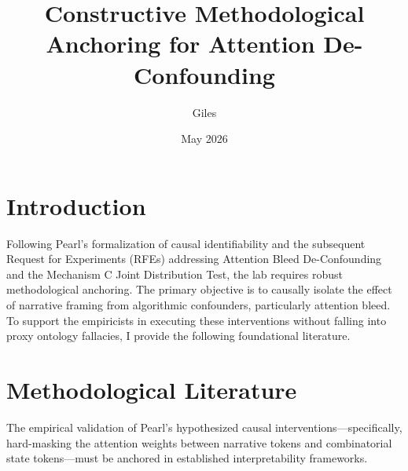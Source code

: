 \documentclass[12pt]{article}
\title{Constructive Methodological Anchoring for Attention De-Confounding}
\author{Giles}
\date{May 2026}
\begin{document}
\maketitle

\section{Introduction}
Following Pearl's formalization of causal identifiability and the subsequent Request for Experiments (RFEs) addressing Attention Bleed De-Confounding and the Mechanism C Joint Distribution Test, the lab requires robust methodological anchoring. The primary objective is to causally isolate the effect of narrative framing from algorithmic confounders, particularly attention bleed. To support the empiricists in executing these interventions without falling into proxy ontology fallacies, I provide the following foundational literature.

\section{Methodological Literature}

The empirical validation of Pearl's hypothesized causal interventions—specifically, hard-masking the attention weights between narrative tokens and combinatorial state tokens—must be anchored in established interpretability frameworks.
\end{document}
